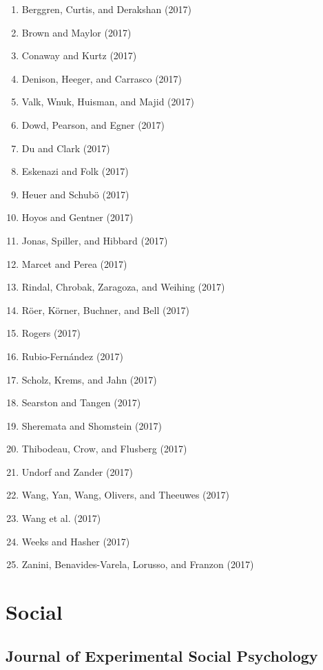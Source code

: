 \documentclass[english,man]{apa6}
\providecommand{\tightlist}{%
  \setlength{\itemsep}{0pt}\setlength{\parskip}{0pt}}
\begin{document}
\begin{enumerate}
\def\labelenumi{\arabic{enumi})}
\tightlist
\item
  Berggren, Curtis, and Derakshan (2017)
\item
  Brown and Maylor (2017)
\item
  Conaway and Kurtz (2017)
\item
  Denison, Heeger, and Carrasco (2017)
\item
  Valk, Wnuk, Huisman, and Majid (2017)
\item
  Dowd, Pearson, and Egner (2017)
\item
  Du and Clark (2017)
\item
  Eskenazi and Folk (2017)
\item
  Heuer and Schubö (2017)
\item
  Hoyos and Gentner (2017)
\item
  Jonas, Spiller, and Hibbard (2017)
\item
  Marcet and Perea (2017)
\item
  Rindal, Chrobak, Zaragoza, and Weihing (2017)
\item
  Röer, Körner, Buchner, and Bell (2017)
\item
  Rogers (2017)
\item
  Rubio-Fernández (2017)
\item
  Scholz, Krems, and Jahn (2017)
\item
  Searston and Tangen (2017)
\item
  Sheremata and Shomstein (2017)
\item
  Thibodeau, Crow, and Flusberg (2017)
\item
  Undorf and Zander (2017)
\item
  Wang, Yan, Wang, Olivers, and Theeuwes (2017)
\item
  Wang et al. (2017)
\item
  Weeks and Hasher (2017)
\item
  Zanini, Benavides-Varela, Lorusso, and Franzon (2017)
\end{enumerate}

\section{Social}\label{social}

\subsection{Journal of Experimental Social
Psychology}\label{journal-of-experimental-social-psychology}
\end{document}
